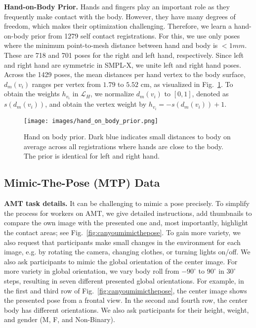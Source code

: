\documentclass[final]{cvpr}
\renewcommand{\eg}{e.g.\xspace}
\theoremstyle{definition}
\begin{document}
\textbf{Hand-on-Body Prior.} Hands and fingers play an important role as they frequently make contact with the body. However, they have many degrees of freedom, which makes their optimization challenging. Therefore, we learn a hand-on-body prior from 1279 self contact registrations. For this, we use only poses where the minimum point-to-mesh distance between hand and body is $< 1 mm$. These are 718 and 701 poses for the right and left hand, respectively. Since left and right hand are symmetric in SMPL-X, we unite left and right hand poses. Across the 1429 poses, the mean distances per hand vertex to the body surface, $d_m(v_i)$ ranges per vertex from $1.79$ to $5.52$ cm, as visualized in Fig.~\ref{fig:handonbodyprior}. To obtain the weights $h_{v_i}$ in $\mathcal{L}_{H}$, we normalize $d_m(v_i)$ to $[0, 1]$, denoted as $s(d_m(v_i))$, and obtain the vertex weight by $h_{v_i} = -s(d_m(v_i)) + 1$.
\begin{figure}[t]
	\begin{center}
		\texttt{[image: images/hand\_on\_body\_prior.png]}
	\end{center}
	\caption{Hand on body prior. Dark blue indicates small distances to body on average across all registrations where hands are close to the body. The prior is identical for left and right hand.}
	\label{fig:handonbodyprior}
\end{figure}


\subsection{Mimic-The-Pose (MTP) Data}
\textbf{AMT task details.} It can be challenging to mimic a pose precisely. To simplify the process for workers on AMT, we give detailed instructions, add thumbnails to compare the own image with the presented one and, most importantly, highlight the contact areas; see Fig.~\ref{fig:canyoumimicthepose}. To gain more variety, we also request that participants make small changes in the environment for each image, \eg by  rotating the camera, changing clothes, or turning lights on/off. We also ask participants to mimic the global orientation of the center image. For more variety in global orientation, we vary body roll from $-90^\circ$ to $90^\circ$ in $30^\circ$ steps, resulting in seven different presented global orientations. For example, in the first and third row of Fig.~\ref{fig:canyoumimicthepose}, the center image shows the presented pose from a frontal view. In the second and fourth row, the center body has different orientations. We also ask participants for their height, weight, and gender (M, F, and Non-Binary).
\end{document}

